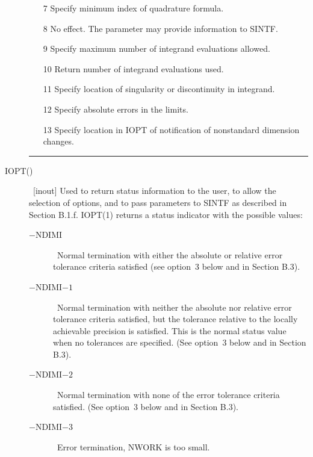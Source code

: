 \documentclass[twoside]{MATH77}
\begin{document}
\begin{description}
\begin{itemize}
\item[7]  Specify minimum index of quadrature formula.

\item[8]  No effect. The parameter may provide information to SINTF.

\item[9]  Specify maximum number of integrand evaluations allowed.

\item[10]  Return number of integrand evaluations used.

\item[11]  Specify location of singularity or discontinuity in integrand.

\item[12]  Specify absolute errors in the limits.

\item[13]  Specify location in IOPT of notification of nonstandard dimension
changes.
\end{itemize}\vspace{-3pt}

\rule{2.9 in}{1 pt}\vspace{3pt}

\item[IOPT()] \  [inout] Used to return status information to the user, to
allow the selection of options, and to pass parameters to SINTF as described
in Section B.1.f. IOPT(1) returns a status indicator with the possible
values:

\begin{description}
\item[\rm $-$NDIMI] \  Normal termination with either the absolute or relative
error tolerance criteria satisfied (see option~3 below and in Section
B.3).

\item[\rm $-$NDIMI$-1$] \  Normal termination with neither the absolute nor
relative error tolerance criteria satisfied, but the tolerance relative to
the locally achievable precision is satisfied. This is the normal status
value when no tolerances are specified. (See option~3 below and in
Section B.3).

\item[\rm $-$NDIMI$-2$] \  Normal termination with none of the error tolerance
criteria satisfied. (See option~3 below and in Section B.3).

\item[\rm $-$NDIMI$-3$] \  Error termination, NWORK is too small.


\end{description}
\end{description}
\end{document}
